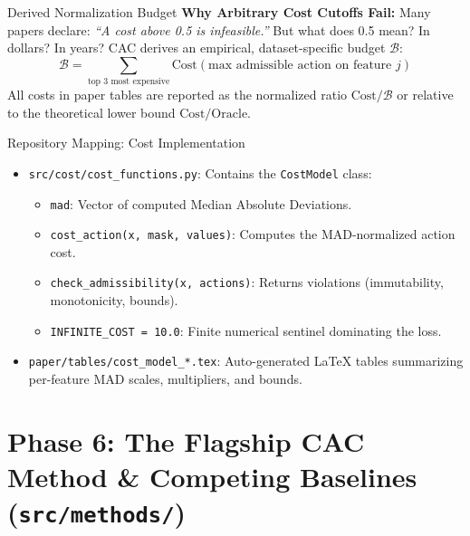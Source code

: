 \documentclass[11pt,a4paper]{article}
\begin{document}
\begin{childbranch}{Derived Normalization Budget}
\textbf{Why Arbitrary Cost Cutoffs Fail:}
Many papers declare: \emph{``A cost above 0.5 is infeasible.''} But what does 0.5 mean? In dollars? In years?
CAC derives an empirical, dataset-specific budget $\mathcal{B}$:
\begin{equation}
\mathcal{B} = \sum_{\text{top 3 most expensive}} \mathrm{Cost}(\text{max admissible action on feature } j)
\end{equation}
All costs in paper tables are reported as the normalized ratio $\mathrm{Cost}/\mathcal{B}$ or relative to the theoretical lower bound $\mathrm{Cost}/\mathrm{Oracle}$.
\end{childbranch}

\begin{codeanatomy}{Repository Mapping: Cost Implementation}
\begin{itemize}[leftmargin=1.2em]
    \item \texttt{src/cost/cost\_functions.py}: Contains the \texttt{CostModel} class:
    \begin{itemize}
        \item \texttt{mad}: Vector of computed Median Absolute Deviations.
        \item \texttt{cost\_action(x, mask, values)}: Computes the MAD-normalized action cost.
        \item \texttt{check\_admissibility(x, actions)}: Returns violations (immutability, monotonicity, bounds).
        \item \texttt{INFINITE\_COST = 10.0}: Finite numerical sentinel dominating the loss.
    \end{itemize}
    \item \texttt{paper/tables/cost\_model\_*.tex}: Auto-generated LaTeX tables summarizing per-feature MAD scales, multipliers, and bounds.
\end{itemize}
\end{codeanatomy}

\newpage
\section{Phase 6: The Flagship CAC Method \& Competing Baselines (\texttt{src/methods/})}
\label{sec:phase6}
\end{document}
